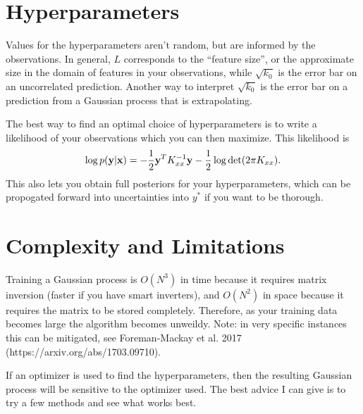 \documentclass[11pt,twoside,a5paper]{article}
\newcommand{\bfx}{{\bf x}}
\newcommand{\bfy}{{\bf y}}
\begin{document}
\section{Hyperparameters}

Values for the hyperparameters aren't random, but are informed by the observations. In general, $L$ corresponds to the ``feature size'', or the approximate size in the domain of features in your observations, while $\sqrt{k_0}$ is the error bar on an uncorrelated prediction. Another way to interpret $\sqrt{k_0}$ is the error bar on a prediction from a Gaussian process that is extrapolating.

The best way to find an optimal choice of hyperparameters is to write a likelihood of your observations which you can then maximize. This likelihood is
\begin{equation}
  \label{eq:likelihood}
  \log p(\bfy | \bfx) = -\frac{1}{2}\bfy^TK_{xx}^{-1}\bfy - \frac{1}{2}\log\det(2\pi K_{xx}).
\end{equation}
This also lets you obtain full posteriors for your hyperparameters, which can be propogated forward into uncertainties into $y^*$ if you want to be thorough.

\section{Complexity and Limitations}

Training a Gaussian process is $O(N^3)$ in time because it requires matrix inversion (faster if you have smart inverters), and $O(N^2)$ in space because it requires the matrix to be stored completely. Therefore, as your training data becomes large the algorithm becomes unweildy. Note: in very specific instances this can be mitigated, see Foreman-Mackay et al. 2017 (https://arxiv.org/abs/1703.09710).

If an optimizer is used to find the hyperparameters, then the resulting Gaussian process will be sensitive to the optimizer used. The best advice I can give is to try a few methods and see what works best.
\end{document}
